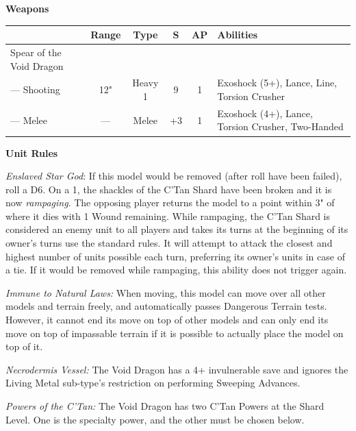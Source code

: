 \begin{minipage}[t]{0.72\textwidth}
	\vspace*{2em}
	\textbf{Weapons}
	
	\begin{tabular}{m{95 pt} *{4}{c} >{\raggedright\arraybackslash}p{130pt}}
		& Range & Type & S & AP & Abilities \\
		\hline
		Spear of the Void Dragon & & & & & \\
		— Shooting & 12" & Heavy 1 & 9 & 1 & Exoshock (5+), Lance, Line, Torsion Crusher \\
		— Melee & — & Melee & +3 & 1 & Exoshock (4+), Lance, Torsion Crusher, Two-Handed \\
	\end{tabular}
	
	\vspace*{2em}
	\textbf{Unit Rules}
	
	\textit{Enslaved Star God}: If this model would be removed (after  roll have been failed), roll a D6. On a 1, the shackles of the C'Tan Shard have been broken and it is now \textit{rampaging}. The opposing player returns the model to a point within 3" of where it dies with 1 Wound remaining. While rampaging, the C'Tan Shard is considered an enemy unit to all players and takes its turns at the beginning of its owner's turns use the standard rules. It will attempt to attack the closest and highest number of units possible each turn, preferring its owner's units in case of a tie. If it would be removed while rampaging, this ability does not trigger again.
	
	\textit{Immune to Natural Laws:} When moving, this model can move over all other models and terrain freely, and automatically passes Dangerous Terrain tests. However, it cannot end its move on top of other models and can only end its move on top of impassable terrain if it is possible to actually place the model on top of it.
		
	\textit{Necrodermis Vessel:} The Void Dragon has a 4+ invulnerable save and ignores the Living Metal sub-type's restriction on performing Sweeping Advances.
	
	\textit{Powers of the C'Tan:} The Void Dragon has two C'Tan Powers at the Shard Level. One is the  specialty power, and the other must be chosen below.
	

\end{minipage}
